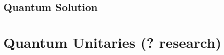 \documentclass{llncs}
\begin{document}
\subsection{Quantum Solution}
\label{sec:quantum-sol}

\section{Quantum Unitaries (? research)}
\label{sec:quantum-unitaries}

\printbibliography{}
\end{document}
